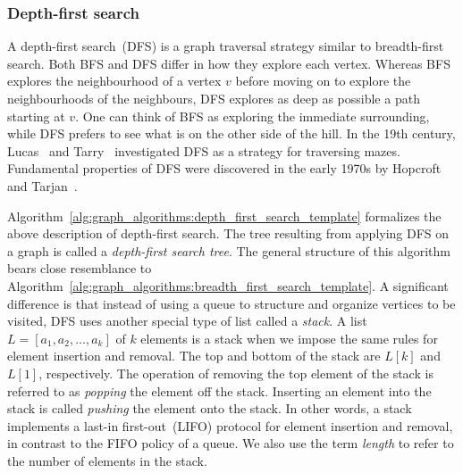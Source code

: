 \subsubsection{Depth-first search}


A depth-first search~(DFS) is a graph traversal strategy similar to
breadth-first search. Both BFS and DFS differ in how they explore each
vertex. Whereas BFS explores the neighbourhood of a vertex $v$ before
moving on to explore the neighbourhoods of the neighbours, DFS explores
as deep as possible a path starting at $v$. One can think of BFS as
exploring the immediate surrounding, while DFS prefers to see what is
on the other side of the hill. In the 19th century,
Lucas~\cite{Lucas1882.1894} and Tarry~\cite{Tarry1895} investigated
DFS as a strategy for traversing mazes. Fundamental properties of DFS
were discovered in the early 1970s by Hopcroft and
Tarjan~\cite{HopcroftTarjan1973,Tarjan1972}.


%
%

Algorithm~\ref{alg:graph_algorithms:depth_first_search_template}
formalizes the above description of depth-first search. The tree
resulting from applying DFS on a graph is called a
\emph{depth-first search tree}. The general structure of this
algorithm bears close resemblance to
Algorithm~\ref{alg:graph_algorithms:breadth_first_search_template}. A
significant difference is that instead of using a queue to structure
and organize vertices to be visited, DFS uses another special type of
list called a \emph{stack}. A list $L = [a_1, a_2, \dots, a_k]$ of $k$
elements is a stack when we impose the same rules for element
insertion and removal. The top and bottom of the stack are $L[k]$ and
$L[1]$, respectively. The operation of removing the top element of the
stack is referred to as \emph{popping} the element off the
stack. Inserting an element into the stack is called \emph{pushing}
the element onto the stack. In other words, a stack implements a
last-in first-out~(LIFO) protocol for element insertion and removal,
in contrast to the FIFO policy of a queue. We also use the term
\emph{length} to refer to the number of elements in the stack.

